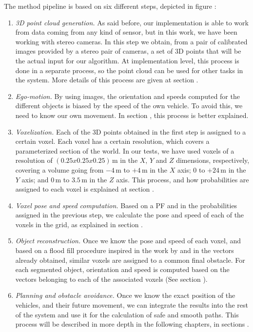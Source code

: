 The method pipeline is based on six different steps, depicted in figure \todo{ \ref{fig:cp05_pipeline_general} }:
\begin{enumerate}
 \item \emph{3D point cloud generation.} As said before, our implementation is able to work from data coming from any kind of sensor, but in this work, we have been working with stereo cameras. In this step we obtain, from a pair of calibrated images provided by a stereo pair of cameras, a set of 3D points that will be the actual input for our algorithm. At implementation level, this process is done in a separate process, so the point cloud can be used for other tasks in the system. More details of this process are given at section \todo{ \ref{chapter05_01_01} }.
 \item \emph{Ego-motion.} By using images, the orientation and speeds computed for the different objects is biased by the speed of the own vehicle. To avoid this, we need to know our own movement. In section \todo{ \ref{chapter05_01_02} }, this process is better explained.
 \item \emph{Voxelization.} Each of the 3D points obtained in the first step is assigned to a certain voxel. Each voxel has a certain resolution, which covers a parameterized section of the world. In our tests, we have used voxels of a resolution of $(0.25x0.25x0.25)$\,m in the $X$, $Y$ and $Z$ dimensions, respectively, covering a volume going from $-4$\,m to $+4$\,m in the $X$ axis; $0$ to $+24$\,m in the $Y$ axis; and $0$\,m to $3.5$\,m in the $Z$ axis. This process, and how probabilities are assigned to each voxel is explained at section \todo{\ref{chapter05_01_03}}.
 \item \emph{Voxel pose and speed computation.} Based on a \ac{PF} and in the probabilities assigned in the previous step, we calculate the pose and speed of each of the voxels in the grid, as explained in section \todo{\ref{chapter05_01_04}}.
 \item \emph{Object reconstruction.} Once we know the pose and speed of each voxel, and based on a flood fill procedure inspired in the work by \cite{broggi2013} and in the vectors already obtained, similar voxels are assigned to a common final obstacle. For each segmented object, orientation and speed is computed based on the vectors belonging to each of the associated voxels (See section \todo{\ref{chapter05_01_05}}).
 \item \emph{Planning and obstacle avoidance.} Once we know the exact position of the vehicles, and their future movement, we can integrate the results into the rest of the system and use it for the calculation of safe and smooth paths. This process will be described in more depth in the following chapters, in sections \todo{ \ref{chapter05_01_06} }.
\end{enumerate}

